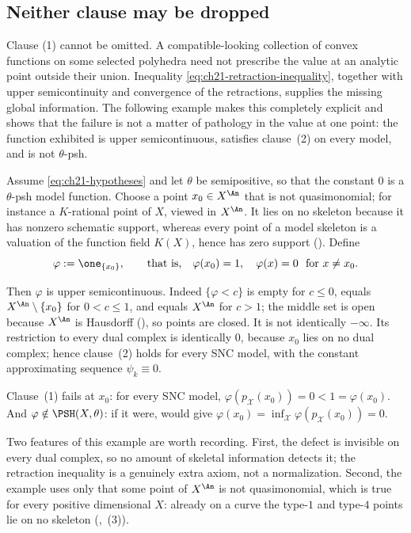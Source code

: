\subsection{Neither clause may be dropped}
\label{sec:ch21-clauses-independent}

Clause (1) cannot be omitted.  A compatible-looking collection of convex
functions on some selected polyhedra need not prescribe the value at an
analytic point outside their union.  Inequality
\eqref{eq:ch21-retraction-inequality}, together with upper
semicontinuity and convergence of the retractions, supplies the missing
global information.  The following example makes this completely explicit
and shows that the failure is not a matter of pathology in the value at one
point: the function exhibited is upper semicontinuous, satisfies clause~(2)
on every model, and is not $\theta$-psh.

\begin{example}
\label{ex:ch21-clause-one-needed}
Assume \eqref{eq:ch21-hypotheses} and let $\theta$ be semipositive, so
that the constant $0$ is a $\theta$-psh model function.  Choose a point
$x_0\in X^{\An}$ that is not quasimonomial; for instance a
$K$-rational point of $X$, viewed in $X^{\An}$.  It lies on no
skeleton because it has nonzero schematic support, whereas every point of a
model skeleton is a valuation of the function field $K(X)$, hence has
zero support
().
Define
\[
 \varphi:=\one_{\{x_0\}},
 \qquad\text{that is,}\quad
 \varphi(x_0)=1,\quad \varphi(x)=0\ \text{ for }x\neq x_0 .
\]

Then $\varphi$ is upper semicontinuous.  Indeed $\{\varphi<c\}$ is empty
for $c\leq0$, equals $X^{\An}\setminus\{x_0\}$ for $0<c\leq1$, and
equals $X^{\An}$ for $c>1$; the middle set is open because $X^{\An}$ is
Hausdorff (), so points are closed.  It is not
identically $-\infty$.  Its restriction to every dual complex is
identically $0$, because $x_0$ lies on no dual complex; hence
clause~(2) holds for every SNC model, with the constant approximating
sequence $\psi_k\equiv0$.

Clause~(1) fails at $x_0$: for every SNC model,
$\varphi(p_{\mathcal X}(x_0))=0<1=\varphi(x_0)$.  And $\varphi\notin
\PSH(X,\theta)$: if it were, 
would give $\varphi(x_0)=\inf_{\mathcal X}\varphi(p_{\mathcal X}(x_0))=0$.

Two features of this example are worth recording.  First, the defect is
invisible on every dual complex, so no amount of skeletal information
detects it; the retraction inequality is a genuinely extra axiom, not a
normalization.  Second, the example uses only that some point of
$X^{\An}$ is not quasimonomial, which is true for every positive
dimensional $X$: already on a curve the type-$1$ and type-$4$ points
lie on no skeleton (,
\,(3)).
\end{example}

